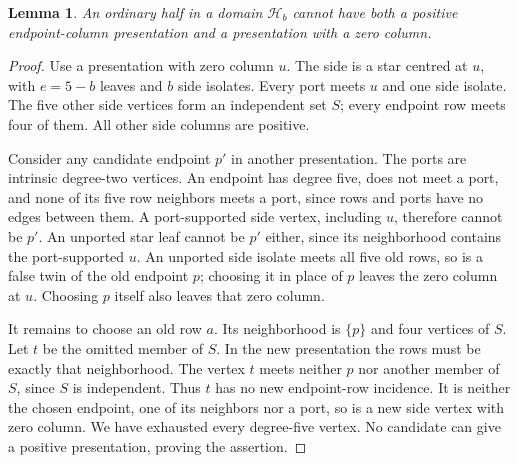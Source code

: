 \documentclass[11pt]{article}
\newtheorem{lemma}[theorem]{Lemma}
\begin{document}
\begin{lemma}\label{zeroinvariant}
An ordinary half in a domain $\mathcal H_b$ cannot have both a positive
endpoint-column presentation and a presentation with a zero column.
\end{lemma}
\begin{proof}
Use a presentation with zero column $u$. The side is a star centred at
$u$, with $e=5-b$ leaves and $b$ side isolates. Every port meets $u$
and one side isolate. The five other side vertices form an independent
set $S$; every endpoint row meets four of them. All other side columns
are positive.

Consider any candidate endpoint $p'$ in another presentation. The ports
are intrinsic degree-two vertices. An endpoint has degree five, does not
meet a port, and none of its five row neighbors meets a port, since rows
and ports have no edges between them. A port-supported side vertex,
including $u$, therefore cannot be $p'$. An unported star leaf cannot
be $p'$ either, since its neighborhood contains the port-supported $u$.
An unported side isolate meets all five old rows, so is a false twin
of the old endpoint $p$; choosing it in place of $p$ leaves the zero
column at $u$. Choosing $p$ itself also leaves that zero column.

It remains to choose an old row $a$. Its neighborhood is $\{p\}$ and
four vertices of $S$. Let $t$ be the omitted member of $S$. In the new
presentation the rows must be exactly that neighborhood. The vertex
$t$ meets neither $p$ nor another member of $S$, since $S$ is independent.
Thus $t$ has no new endpoint-row incidence. It is neither the chosen
endpoint, one of its neighbors nor a port, so is a new side vertex
with zero column. We have exhausted every degree-five vertex. No
candidate can give a positive presentation, proving the assertion.
\end{proof}
\end{document}
